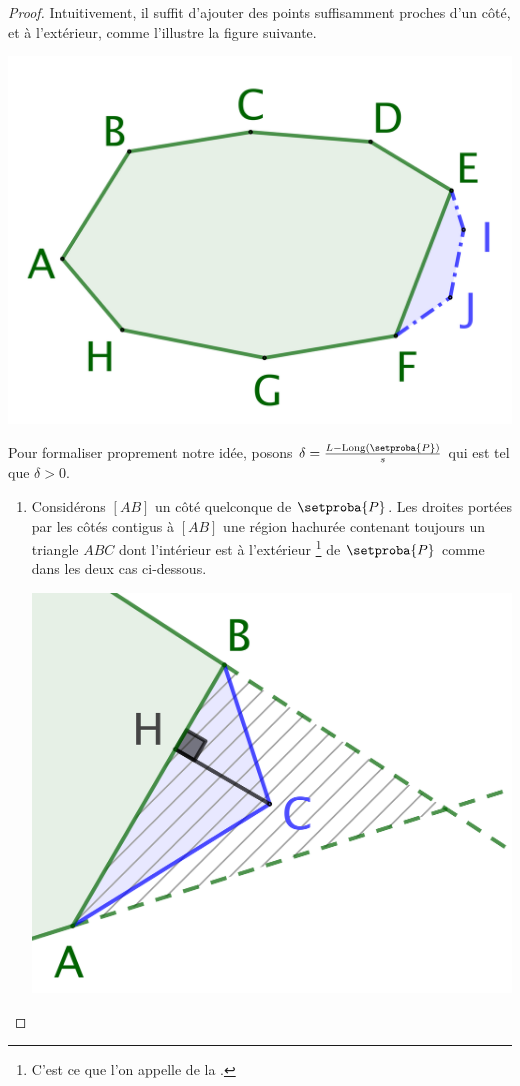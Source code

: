 \begin{proof}
    Intuitivement, il suffit d'ajouter des points suffisamment proches d'un côté, et à l'extérieur, comme l'illustre la figure suivante.
    \begin{center}
        \includegraphics[scale=.4]{content/polygon/at-least-one/bigger-convex.png}
    \end{center}
    
    Pour formaliser proprement notre idée, posons
	$\delta = \frac{L - \cyclelen{\setproba{P}}}{s}$ qui est tel que $\delta > 0$.
	\begin{enumerate}
		\item \label{add-vertex-start}
		Considérons $[AB]$ un côté quelconque de $\setproba{P}$.
		Les droites portées par les côtés contigus à $[AB]$  une région hachurée contenant toujours un triangle $ABC$ dont l'intérieur est à l'extérieur
		\footnote{
			C'est ce que l'on appelle de la .
		}
		de $\setproba{P}$ comme dans les deux cas ci-dessous.
		\begin{multicols}{2}
			\centering

			\includegraphics[scale=.35]{content/polygon/sol-must-be/add-vertex-1.png}


\end{multicols}
\end{enumerate}
\end{proof}
